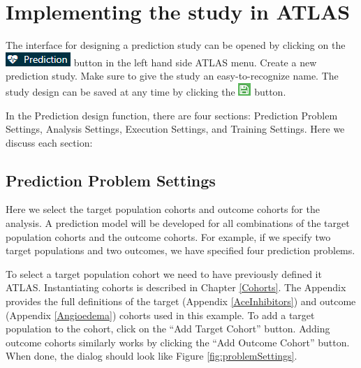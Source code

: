 \documentclass[11pt]{book}
\theoremstyle{definition}
\theoremstyle{definition}
\theoremstyle{definition}
\theoremstyle{remark}
\begin{document}
\hypertarget{implementing-the-study-in-atlas}{%
\section{Implementing the study in ATLAS}\label{implementing-the-study-in-atlas}}

The interface for designing a prediction study can be opened by clicking on the \includegraphics{images/PatientLevelPrediction/predictionButton.png} button in the left hand side ATLAS menu. Create a new prediction study. Make sure to give the study an easy-to-recognize name. The study design can be saved at any time by clicking the \includegraphics{images/PopulationLevelEstimation/save.png} button.

In the Prediction design function, there are four sections: Prediction Problem Settings, Analysis Settings, Execution Settings, and Training Settings. Here we discuss each section:

\hypertarget{prediction-problem-settings}{%
\subsection{Prediction Problem Settings}\label{prediction-problem-settings}}

Here we select the target population cohorts and outcome cohorts for the analysis. A prediction model will be developed for all combinations of the target population cohorts and the outcome cohorts. For example, if we specify two target populations and two outcomes, we have specified four prediction problems.

To select a target population cohort we need to have previously defined it ATLAS. Instantiating cohorts is described in Chapter \ref{Cohorts}. The Appendix provides the full definitions of the target (Appendix \ref{AceInhibitors}) and outcome (Appendix \ref{Angioedema}) cohorts used in this example. To add a target population to the cohort, click on the ``Add Target Cohort'' button. Adding outcome cohorts similarly works by clicking the ``Add Outcome Cohort'' button. When done, the dialog should look like Figure \ref{fig:problemSettings}.
\end{document}
